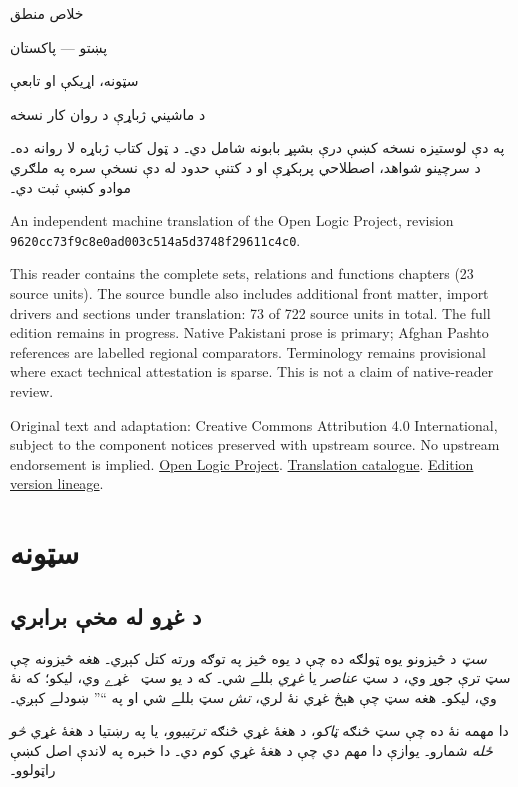\documentclass[12pt,a4paper,oneside]{report}
\newcommand{\olfileid}[3]{\gdef\pspart{#1}\gdef\pschapter{#2}\gdef\pssection{#3}}
\newcommand{\olchapter}[3]{\gdef\pspart{#1}\gdef\pschapter{#2}\gdef\pssection{}\chapter{#3}\label{#1:#2::chap}}
\newcommand{\olsection}[1]{\section{#1}\label{\pspart:\pschapter:\pssection:sec}}
\newenvironment{explain}{}{}
\begin{document}
\setRTL
\begin{titlepage}
\begin{center}
\vspace*{25mm}
{\Huge خلاص منطق}\par\bigskip
{\Large پښتو — پاکستان}\par\bigskip
{\LARGE سټونه، اړيکې او تابعې}\par\bigskip
د ماشيني ژباړې د روان کار نسخه
\end{center}
\bigskip
په دې لوستيزه نسخه کښې درې بشپړ بابونه شامل دي۔ د ټول کتاب ژباړه لا
روانه ده۔ د سرچينو شواهد، اصطلاحي پرېکړې او د کتنې حدود له دې نسخې
سره په ملګري موادو کښې ثبت دي۔
\begin{LTR}\latinfont\small
An independent machine translation of the Open Logic Project, revision\\
\texttt{9620cc73f9c8e0ad003c514a5d3748f29611c4c0}.\par
This reader contains the complete sets, relations and functions chapters (23 source
units). The source bundle also includes additional front matter, import drivers
and sections under translation: 73 of 722 source units in total.
The full edition remains in progress.
Native Pakistani prose is primary; Afghan Pashto references are labelled
regional comparators. Terminology remains provisional where exact technical
attestation is sparse. This is not a claim of native-reader review.

Original text and adaptation: Creative Commons Attribution 4.0 International,
subject to the component notices preserved with upstream source.
No upstream endorsement is implied.
\href{https://openlogicproject.org/}{Open Logic Project}.\quad
\href{https://github.com/KokunoYumeto/OpenLogic-translations}{Translation catalogue}.\quad
\href{https://doi.org/10.5281/zenodo.22307197}{Edition version lineage}.
\end{LTR}
\end{titlepage}
\tableofcontents
\clearpage

\olchapter{sfr}{set}{سټونه}


\olfileid{sfr}{set}{bas}
\olsection{د غړو له مخې برابري}

\emph{سټ} د څيزونو يوه ټولګه ده چې د يوه څيز په توګه ورته کتل کېږي۔ هغه څيزونه چې سټ ترې جوړ وي، د سټ \emph{عناصر} يا \emph{غړي} بللے شي۔ که  د يو سټ~ غړے وي،  ليکو؛ که نۀ وي،  ليکو۔ هغه سټ چې هېڅ غړي نۀ لري، \emph{تش} سټ بللے شي او په ``\LR{$\emptyset$}'' ښودلے کېږي۔

\begin{explain}
دا مهمه نۀ ده چې سټ څنګه \emph{ټاکو}، د هغۀ غړي څنګه \emph{ترتيبوو}، يا په رښتيا د هغۀ غړي \emph{څو ځله} شمارو۔ يوازې دا مهم دي چې د هغۀ غړي کوم دي۔ دا خبره په لاندې اصل کښې راټولوو۔
\end{explain}
\end{document}
